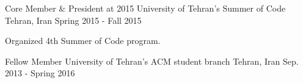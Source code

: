 

\begin{cventries}

  \cventry
  	{Core Member \& President at 2015}
  	{University of Tehran's Summer of Code}
  	{Tehran, Iran}
  	{Spring 2015 - Fall 2015}
  	{
  		\begin{cvitems}
  			\item {Organized 4th Summer of Code program.}
  		\end{cvitems}
  	}

  \cventry
    {Fellow Member} %
    {University of Tehran's ACM student branch} %
    {Tehran, Iran} %
    {Sep. 2013 - Spring 2016} %
    {
    }

\end{cventries}
